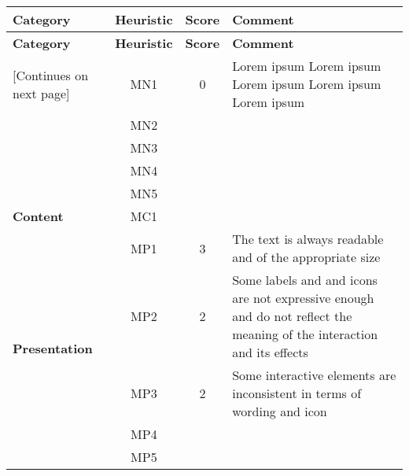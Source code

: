 \begin{tabularx}{\linewidth}{l c c X}
\toprule
\textbf{Category} & \textbf{Heuristic} & \textbf{Score} & \textbf{Comment} \\
\midrule
\endfirsthead
\toprule
\textbf{Category} & \textbf{Heuristic} & \textbf{Score} & \textbf{Comment} \\
\midrule
\endhead
\midrule
\footnotesize [Continues on next page]
\endfoot
\bottomrule
\endlastfoot

\multirow{5}{*}{\textbf{Navigation}}   & MN1 & 0 & Lorem ipsum Lorem ipsum Lorem ipsum Lorem ipsum Lorem ipsum \\ \cmidrule{2-4} 
    & MN2 &  &  \\ \cmidrule{2-4} 
    & MN3 &  &  \\ \cmidrule{2-4} 
    & MN4 &  &  \\ \cmidrule{2-4} 
    & MN5 &  &  \\ \midrule
\textbf{Content}                       & MC1 &  &  \\ \midrule
\multirow{5}{*}{\textbf{Presentation}} & MP1 & 3 & The text is always readable and of the appropriate size \\ \cmidrule{2-4} 
    & MP2 & 2 & Some labels and and icons are not expressive enough and do not reflect the meaning of the interaction and its effects\\ \cmidrule{2-4} 
    & MP3 & 2 & Some interactive elements are inconsistent in terms of wording and icon\\ \cmidrule{2-4} 
    & MP4 &  &  \\ \cmidrule{2-4} 
    & MP5 &  &
\end{tabularx}
